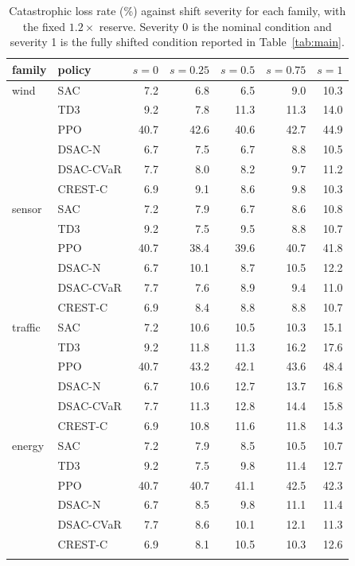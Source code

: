 \begin{table}[tb]
\centering
\caption{Catastrophic loss rate (\%) against shift severity for each family, with the fixed $1.2\times$ reserve. Severity 0 is the nominal condition and severity 1 is the fully shifted condition reported in Table~\ref{tab:main}.}
\label{tab:sev}
\small
\begin{tabular}{llrrrrr}
\toprule
family & policy & $s=0$ & $s=0.25$ & $s=0.5$ & $s=0.75$ & $s=1$ \\
\midrule
wind & SAC & 7.2 & 6.8 & 6.5 & 9.0 & 10.3 \\
 & TD3 & 9.2 & 7.8 & 11.3 & 11.3 & 14.0 \\
 & PPO & 40.7 & 42.6 & 40.6 & 42.7 & 44.9 \\
 & DSAC-N & 6.7 & 7.5 & 6.7 & 8.8 & 10.5 \\
 & DSAC-CVaR & 7.7 & 8.0 & 8.2 & 9.7 & 11.2 \\
 & CREST-C & 6.9 & 9.1 & 8.6 & 9.8 & 10.3 \\
\addlinespace[2pt]
sensor & SAC & 7.2 & 7.9 & 6.7 & 8.6 & 10.8 \\
 & TD3 & 9.2 & 7.5 & 9.5 & 8.8 & 10.7 \\
 & PPO & 40.7 & 38.4 & 39.6 & 40.7 & 41.8 \\
 & DSAC-N & 6.7 & 10.1 & 8.7 & 10.5 & 12.2 \\
 & DSAC-CVaR & 7.7 & 7.6 & 8.9 & 9.4 & 11.0 \\
 & CREST-C & 6.9 & 8.4 & 8.8 & 8.8 & 10.7 \\
\addlinespace[2pt]
traffic & SAC & 7.2 & 10.6 & 10.5 & 10.3 & 15.1 \\
 & TD3 & 9.2 & 11.8 & 11.3 & 16.2 & 17.6 \\
 & PPO & 40.7 & 43.2 & 42.1 & 43.6 & 48.4 \\
 & DSAC-N & 6.7 & 10.6 & 12.7 & 13.7 & 16.8 \\
 & DSAC-CVaR & 7.7 & 11.3 & 12.8 & 14.4 & 15.8 \\
 & CREST-C & 6.9 & 10.8 & 11.6 & 11.8 & 14.3 \\
\addlinespace[2pt]
energy & SAC & 7.2 & 7.9 & 8.5 & 10.5 & 10.7 \\
 & TD3 & 9.2 & 7.5 & 9.8 & 11.4 & 12.7 \\
 & PPO & 40.7 & 40.7 & 41.1 & 42.5 & 42.3 \\
 & DSAC-N & 6.7 & 8.5 & 9.8 & 11.1 & 11.4 \\
 & DSAC-CVaR & 7.7 & 8.6 & 10.1 & 12.1 & 11.3 \\
 & CREST-C & 6.9 & 8.1 & 10.5 & 10.3 & 12.6 \\
\addlinespace[2pt]
\bottomrule
\end{tabular}
\end{table}